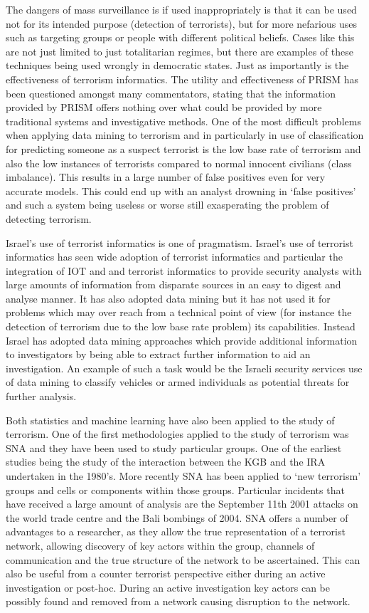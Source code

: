The dangers of mass surveillance is if used inappropriately is that it can be used not for its intended purpose (detection of terrorists), but for more nefarious uses such as targeting groups or people with different political beliefs.  Cases like this are not just limited to just totalitarian regimes, but there are examples of these techniques being used wrongly in democratic states. Just as importantly is the effectiveness of terrorism informatics. The utility and effectiveness of PRISM has been questioned amongst many commentators, stating that the information provided by PRISM offers nothing over what could be provided by more traditional  systems and investigative methods. One of the most difficult problems when applying data mining to terrorism and in particularly in use of classification for predicting someone as a suspect terrorist is the low base rate of terrorism and also the low instances of terrorists compared to normal innocent civilians (class imbalance). This results in a large number of false positives even for very accurate models. This could end up with an analyst drowning in ‘false positives’ and such a system being useless or worse still exasperating the problem of detecting terrorism.  

Israel’s use of terrorist informatics is one of pragmatism. Israel’s use of terrorist informatics has seen wide adoption of terrorist informatics and particular the integration of IOT and and terrorist informatics to provide security analysts with large amounts of information from disparate sources in an easy to digest and analyse manner. It has also adopted data mining but it has not used it for problems which may over reach from a technical point of view (for instance the detection of terrorism due to the low base rate problem) its capabilities. Instead Israel has adopted data mining approaches which provide additional information to investigators by being able to extract further information to aid an investigation. An example of such a task would be the Israeli security services use of data mining to classify vehicles or armed individuals as potential threats for further analysis.

Both statistics and machine learning have also been applied to the study of terrorism. One of the first methodologies applied to the study of terrorism was SNA and they have been used to study particular groups. One of the earliest studies being the study of the interaction between the KGB and the IRA undertaken in the 1980’s. More recently SNA has been applied to ‘new terrorism’ groups and cells or components within those groups. Particular incidents that have received a large amount of analysis are the September 11th 2001 attacks on the world trade centre and the Bali bombings of 2004. SNA offers a number of advantages to a researcher, as they allow the true representation of a terrorist network, allowing discovery of key actors within the group, channels of communication and the true structure of the network to be ascertained. This can also be useful from a counter terrorist perspective either during an active investigation or post-hoc. During an active investigation key actors can be possibly found and removed from a network causing disruption to the network. 

